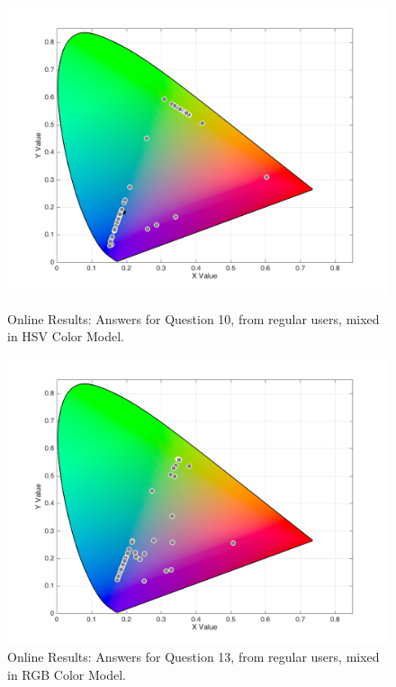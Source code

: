 \begin{figure}[htbp]
  \centering
  \begin{minipage}{0.48\textwidth}
    \centering
    \includegraphics[width=\textwidth]{images/results/10_online_HSVresponses.png}
    \caption[Online Results: Answers for Question 10, from regular users, mixed in HSV Color Model.]{Online Results: Answers for Question 10, from regular users, mixed in HSV Color Model.}
    \label{fig:onlinehsvregular_10}
  \end{minipage}\hfill
  \begin{minipage}{0.48\textwidth}
    \centering
    \includegraphics[width=\textwidth]{images/results/13_online_RGBresponses.png}
    \caption[Online Results: Answers for Question 13, from regular users, mixed in RGB Color Model.]{Online Results: Answers for Question 13, from regular users, mixed in RGB Color Model.}
    \label{fig:onlinehsvregular_13}
  \end{minipage}
\end{figure}
%
